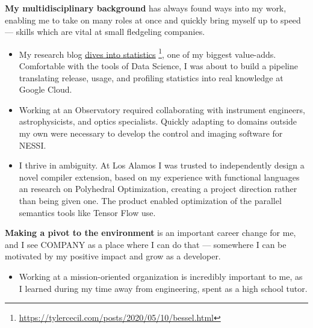 \documentclass[sans, a4paper, 11pt]{article}
\newcommand{\cvcolor}[1]{{\color{MidnightBlue}#1}}
\renewcommand{\hl}[1]{\cvcolor{\textbf{#1}}}
\renewcommand{\cite}[2]{\href{#2}{\ul{#1}} \footnote{\href{#2}{#2}}}
\begin{document}
\begin{adjustwidth}{40pt}{40pt}
  \hl{My multidisciplinary background} has always found ways into my work,
  enabling me to take on many roles at once and quickly bring myself up to
  speed --- skills which are vital at small fledgeling companies.
  \begin{itemize}


    \item My research blog \cite{dives into
      statistics}{https://tylercecil.com/posts/2020/05/10/bessel.html}, one of
      my biggest value-adds. Comfortable with the tools of Data Science, I was
      about to build a pipeline translating release, usage, and profiling
      statistics into real knowledge at Google Cloud.

    \item Working at an Observatory required collaborating with instrument
      engineers, astrophysicists, and optics specialists. Quickly adapting to
      domains outside my own were necessary to develop the control and imaging
      software for NESSI.

    \item I thrive in ambiguity. At Los Alamos I was trusted to independently
      design a novel compiler extension, based on my experience with functional
      languages an research on Polyhedral Optimization, creating a project
      direction rather than being given one. The product enabled optimization
      of the parallel semantics tools like Tensor Flow use.
  \end{itemize} \medskip

  \hl{Making a pivot to the environment} is an important career change for me,
  and I see COMPANY as a place where I can do that --- somewhere I can be
  motivated by my positive impact and grow as a developer.
  \begin{itemize}
    \item Working at a mission-oriented organization is incredibly important
      to me, as I learned during my time away from engineering, spent as a
      high school tutor.


\end{itemize}
\end{adjustwidth}
\end{document}
